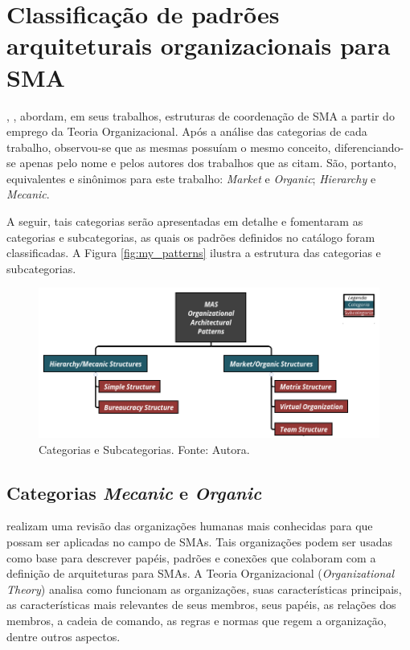 \chapter{Classificação de padrões arquiteturais organizacionais para SMA}\label{sec:criterios_categoria}

, ,  abordam, em seus trabalhos, estruturas de coordenação de SMA a partir do emprego da Teoria Organizacional. Após a análise das categorias de cada trabalho, observou-se que as mesmas possuíam o mesmo conceito, diferenciando-se apenas pelo nome e pelos autores dos trabalhos que as citam. São, portanto, equivalentes e sinônimos para este trabalho: \textit{Market} e \textit{Organic}; \textit{Hierarchy} e \textit{Mecanic}. 

A seguir, tais categorias serão apresentadas em detalhe e fomentaram as categorias e subcategorias, as quais os padrões definidos no catálogo foram classificadas. A Figura \ref{fig:my_patterns} ilustra a estrutura das categorias e subcategorias. 

\begin{figure}[H]
    \centering
    \includegraphics[scale=0.5]{figuras/MAS_Categories.png}
    \caption{Categorias e Subcategorias. Fonte: Autora.}
    \label{fig:categories}
\end{figure}

\section{Categorias \textit{Mecanic} e \textit{Organic}}

 realizam uma revisão das organizações humanas mais conhecidas para que possam ser aplicadas no campo de SMAs. Tais organizações podem ser usadas como base para descrever papéis, padrões e conexões que colaboram com a definição de arquiteturas para SMAs. A Teoria Organizacional (\textit{Organizational Theory}) analisa como funcionam as organizações, suas características principais, as características mais relevantes de seus membros, seus papéis, as relações dos membros, a cadeia de comando, as regras e normas que regem a organização, dentre outros aspectos. 

